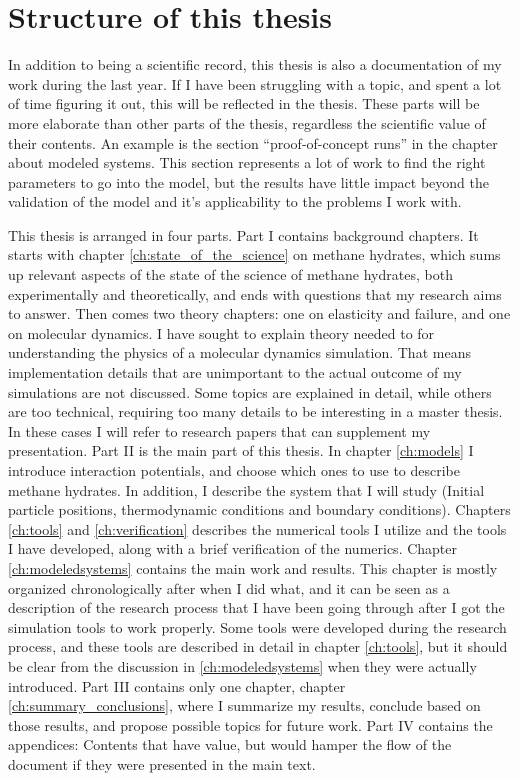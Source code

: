 \section{Structure of this thesis}
In addition to being a scientific record, this thesis is also a documentation of my work during the last year. If I have been struggling with a topic, and spent a lot of time figuring it out, this will be reflected in the thesis. These parts will be more elaborate than other parts of the thesis, regardless the scientific value of their contents. An example is the section ``proof-of-concept runs'' in the chapter about modeled systems.  This section represents a lot of work to find the right parameters to go into the model, but the results have little impact beyond the validation of the model and it's applicability to the problems I work with.

This thesis is arranged in four parts. Part I contains background chapters. It starts with chapter \ref{ch:state_of_the_science} on methane hydrates, which sums up relevant aspects of the state of the science of methane hydrates, both experimentally and theoretically, and ends with questions that my research aims to answer. Then comes two theory chapters: one on elasticity and failure, and one on molecular dynamics. I have sought to explain theory needed to for understanding the physics of a molecular dynamics simulation. That means implementation details that are unimportant to the actual outcome of my simulations are not discussed. Some topics are explained in detail, while others are too technical, requiring too many details to be interesting in a master thesis. In these cases I will refer to research papers that can supplement my presentation. Part II is the main part of this thesis. In chapter \ref{ch:models} I introduce interaction potentials, and choose which ones to use to describe methane hydrates. In addition, I describe the system that I will study (Initial particle positions, thermodynamic conditions and boundary conditions). Chapters \ref{ch:tools} and \ref{ch:verification} describes the numerical tools I utilize and the tools I have developed, along with a brief verification of the numerics. Chapter \ref{ch:modeledsystems} contains the main work and results. This chapter is mostly organized chronologically after when I did what, and it can be seen as a description of the research process that I have been going through after I got the simulation tools to work properly. Some tools were developed during the research process, and these tools are described in detail in chapter \ref{ch:tools}, but it should be clear from the discussion in \ref{ch:modeledsystems} when they were actually introduced. Part III contains only one chapter, chapter \ref{ch:summary_conclusions}, where I summarize my results, conclude based on those results, and propose possible topics for future work. Part IV contains the appendices: Contents that have value, but would hamper the flow of the document if they were presented in the main text.


